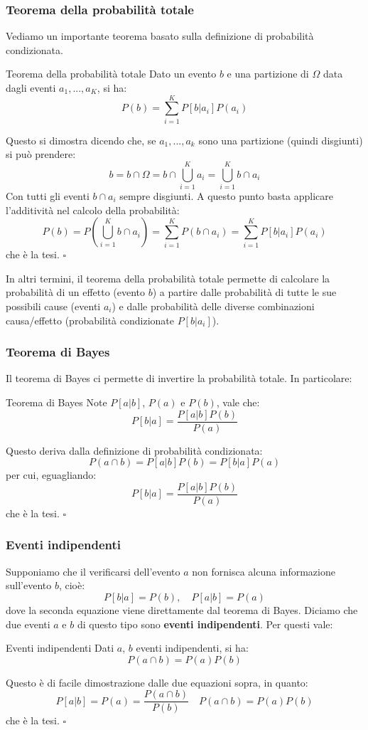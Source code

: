 \documentclass[a4paper,11pt]{article}
\begin{document}
\subsubsection{Teorema della probabilità totale}
Vediamo un importante teorema basato sulla definizione di probabilità condizionata.
\begin{theorem}{Teorema della probabilità totale}
	Dato un evento $b$ e una partizione di $\Omega$ data dagli eventi $a_1, ..., a_K$, si ha:
$$
P(b) = \sum_{i = 1}^K P[b | a_i] P(a_i)
$$
\end{theorem}

Questo si dimostra dicendo che, se $a_1, ..., a_k$ sono una partizione (quindi disgiunti) si può prendere:
$$
b = b \cap \Omega = b \cap \bigcup_{i=1}^K a_i = \bigcup_{i=1}^K b \cap a_i
$$
Con tutti gli eventi $b \cap a_i$ sempre disgiunti. A questo punto basta applicare l'additività nel calcolo della probabilità:
$$
P(b) = P\left( \bigcup_{i=1}^K b \cap a_i \right) = \sum_{i=1}^K P(b \cap a_i) = \sum_{i=1}^K P[b | a_i] P(a_i)
$$
che è la tesi. \hfill $\square$

In altri termini, il teorema della probabilità totale permette di calcolare la probabilità di un effetto (evento $b$) a partire dalle probabilità di tutte le sue possibili cause (eventi $a_i$) e dalle probabilità delle diverse combinazioni causa/effetto (probabilità condizionate $P[b|a_i]$).

\subsubsection{Teorema di Bayes}
Il teorema di Bayes ci permette di invertire la probabilità totale. In particolare:
\begin{theorem}{Teorema di Bayes}
Note $P[a|b]$, $P(a)$ e $P(b)$, vale che:
$$
P[b|a] = \frac{P[a | b]P(b)}{P(a)}
$$
\end{theorem}

Questo deriva dalla definizione di probabilità condizionata:
$$
P(a \cap b) = P[a | b] P(b) = P[b | a] P(a)
$$
per cui, eguagliando:
$$
P[b|a] = \frac{P[a | b]P(b)}{P(a)}
$$
che è la tesi. \hfill $\square$

\subsubsection{Eventi indipendenti}
Supponiamo che il verificarsi dell'evento $a$ non fornisca alcuna informazione sull'evento $b$, cioè:
$$
P[b | a] = P(b), \quad P[a | b] = P(a)
$$
dove la seconda equazione viene direttamente dal teorema di Bayes. 
Diciamo che due eventi $a$ e $b$ di questo tipo sono \textbf{eventi indipendenti}. Per questi vale:
\begin{theorem}{Eventi indipendenti}
	Dati $a$, $b$ eventi indipendenti, si ha:
	$$
	P(a \cap b) = P(a)P(b)
	$$
\end{theorem}
Questo è di facile dimostrazione dalle due equazioni sopra, in quanto:
$$
P[a | b] = P(a) = \frac{P(a \cap b)}{P(b)} \quad P(a \cap b) = P(a)P(b)
$$
che è la tesi. \hfill $\square$
\end{document}

